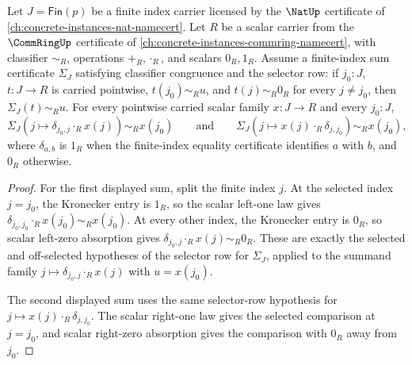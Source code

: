 \begin{lemma}
\label{lem:matrix-finite-kronecker-selector-sum}
Let $J=\mathsf{Fin}(p)$ be a finite index carrier licensed by the $\NatUp$
certificate of \autoref{ch:concrete-instances-nat-namecert}. Let $R$ be a
scalar carrier from the $\CommRingUp$ certificate of
\autoref{ch:concrete-instances-commring-namecert}, with classifier $\sim_R$,
operations $+_R,\cdot_R$, and scalars $0_R,1_R$. Assume a finite-index sum
certificate $\Sigma_J$ satisfying classifier congruence and the selector row:
if $j_0:J$, $t:J\to R$ is carried pointwise, $t(j_0)\sim_R u$, and
$t(j)\sim_R 0_R$ for every $j\ne j_0$, then $\Sigma_J(t)\sim_R u$.
For every pointwise carried scalar family $x:J\to R$ and every $j_0:J$,
$$
\Sigma_J(j\mapsto \delta_{j_0,j}\cdot_R x(j))\sim_R x(j_0)
\qquad\text{and}\qquad
\Sigma_J(j\mapsto x(j)\cdot_R \delta_{j,j_0})\sim_R x(j_0),
$$
where $\delta_{a,b}$ is $1_R$ when the finite-index equality certificate
identifies $a$ with $b$, and $0_R$ otherwise.
\end{lemma}
\begin{proof}
For the first displayed sum, split the finite index $j$. At the selected index
$j=j_0$, the Kronecker entry is $1_R$, so the scalar left-one law gives
$\delta_{j_0,j_0}\cdot_R x(j_0)\sim_R x(j_0)$. At every other index, the
Kronecker entry is $0_R$, so scalar left-zero absorption gives
$\delta_{j_0,j}\cdot_R x(j)\sim_R 0_R$. These are exactly the selected and
off-selected hypotheses of the selector row for $\Sigma_J$, applied to the
summand family $j\mapsto \delta_{j_0,j}\cdot_R x(j)$ with $u=x(j_0)$.

The second displayed sum uses the same selector-row hypothesis for
$j\mapsto x(j)\cdot_R \delta_{j,j_0}$. The scalar right-one law gives the
selected comparison at $j=j_0$, and scalar right-zero absorption gives the
comparison with $0_R$ away from $j_0$.
\end{proof}

